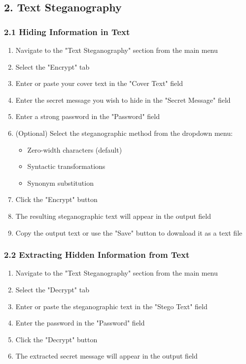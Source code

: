 \documentclass[12pt, a4paper, oneside]{book}
\begin{document}
\subsection*{2. Text Steganography}

\subsubsection*{2.1 Hiding Information in Text}

\begin{enumerate}
    \item Navigate to the "Text Steganography" section from the main menu
    \item Select the "Encrypt" tab
    \item Enter or paste your cover text in the "Cover Text" field
    \item Enter the secret message you wish to hide in the "Secret Message" field
    \item Enter a strong password in the "Password" field
    \item (Optional) Select the steganographic method from the dropdown menu:
    \begin{itemize}
        \item Zero-width characters (default)
        \item Syntactic transformations
        \item Synonym substitution
    \end{itemize}
    \item Click the "Encrypt" button
    \item The resulting steganographic text will appear in the output field
    \item Copy the output text or use the "Save" button to download it as a text file
\end{enumerate}

\subsubsection*{2.2 Extracting Hidden Information from Text}

\begin{enumerate}
    \item Navigate to the "Text Steganography" section from the main menu
    \item Select the "Decrypt" tab
    \item Enter or paste the steganographic text in the "Stego Text" field
    \item Enter the password in the "Password" field
    \item Click the "Decrypt" button
    \item The extracted secret message will appear in the output field
\end{enumerate}
\end{document}
